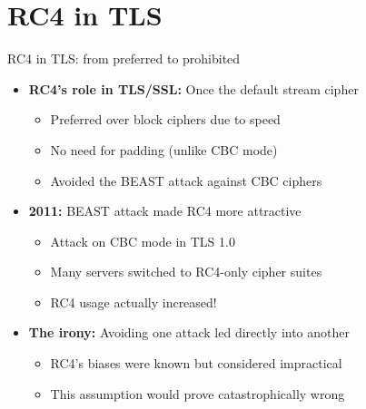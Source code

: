 \documentclass[aspectratio=169, lualatex, handout]{beamer}
\begin{document}
\section{RC4 in TLS}

\begin{frame}{RC4 in TLS: from preferred to prohibited}
	\begin{itemize}[<+->]
		\item \textbf{RC4's role in TLS/SSL:} Once the default stream cipher
		      \begin{itemize}[<+->]
			      \item Preferred over block ciphers due to speed
			      \item No need for padding (unlike CBC mode)
			      \item Avoided the BEAST attack against CBC ciphers
		      \end{itemize}
		\item \textbf{2011:} BEAST attack made RC4 more attractive
		      \begin{itemize}[<+->]
			      \item Attack on CBC mode in TLS 1.0
			      \item Many servers switched to RC4-only cipher suites
			      \item RC4 usage actually increased!
		      \end{itemize}
		\item \textbf{The irony:} Avoiding one attack led directly into another
		      \begin{itemize}[<+->]
			      \item RC4's biases were known but considered impractical
			      \item This assumption would prove catastrophically wrong
		      \end{itemize}
	\end{itemize}
\end{frame}
\end{document}
